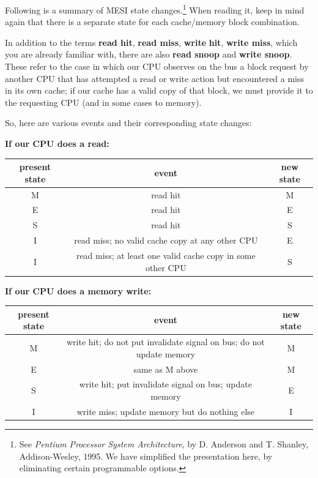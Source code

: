 \par{} \vspace{0.3cm}

Following is a summary of MESI state changes.\footnote{See \emph{Pentium
Processor System Architecture}, by D. Anderson and T.  Shanley,
Addison-Wesley, 1995. We have simplified the presentation here, by
eliminating certain programmable options.} When reading it, keep in mind
again that there is a separate state for each cache/memory block combination.

In addition to the terms \textbf{read hit}, \textbf{read miss},
\textbf{write} \textbf{hit}, \textbf{write miss}, which you are already
familiar with, there are also \textbf{read snoop} and \textbf{write
snoop}.  These refer to the case in which our CPU observes on the bus a
block request by another CPU that has attempted a read or write action
but encountered a miss in its own cache; if our cache has a valid copy
of that block, we must provide it to the requesting CPU (and in some
cases to memory).

So, here are various events and their corresponding state changes:

{\bf If our CPU does a read:} 

\begin{tabular}{|c|c|c|}
\hline 
present state&
 event&
 new state\\
\hline 
M&
 read hit&
 M\\
\hline 
E&
 read hit&
 E\\
\hline 
S&
 read hit&
 S\\
\hline 
I&
 read miss; no valid cache copy at any other CPU &
 E\\
\hline 
I&
 read miss; at least one valid cache copy in some other CPU &
 S  \\
\hline 
\end{tabular}

\par{} \vspace{0.3cm}

{\bf If our CPU does a memory write:}

\begin{tabular}{|c|c|c|}
\hline 
present state&
 event&
 new state\\
\hline 
M&
 write hit; do not put invalidate signal on bus; do not update memory&
 M\\
\hline 
E&
 same as M above&
 M\\
\hline 
S&
 write hit; put invalidate signal on bus; update memory&
 E\\
\hline 
I&
 write miss; update memory but do nothing else&
 I  \\
\hline 
\end{tabular}

